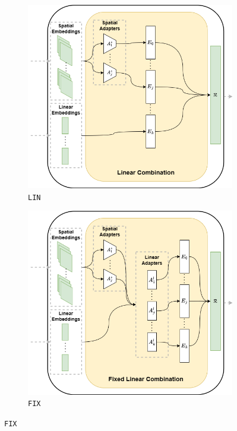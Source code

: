 \begin{figure}[ht]
    \centering
    \begin{subfigure}[b]{0.49\textwidth}
        \centering
        \includegraphics[width=\textwidth]{images/lin}
        \caption{\texttt{LIN}}
        \label{fig:lin}
    \end{subfigure}
    \hfill
    \begin{subfigure}[b]{0.49\textwidth}
        \centering
        \includegraphics[width=\textwidth]{images/fix}
        \caption{\texttt{FIX}}
        \label{fig:fix_lin}
    \end{subfigure}


\end{figure}
